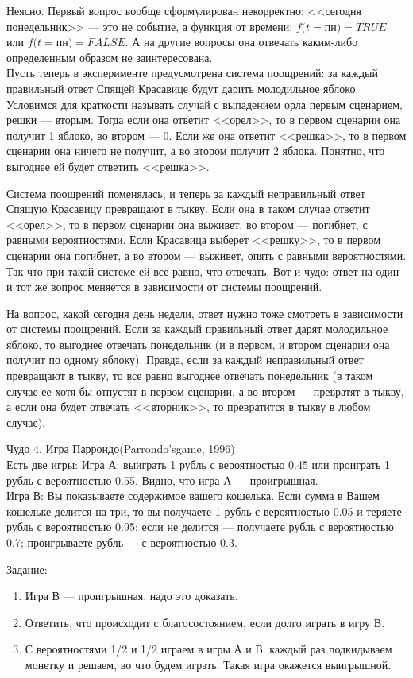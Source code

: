 Неясно. Первый вопрос вообще сформулирован некорректно: <<сегодня понедельник>> --- это не событие, а функция от времени: $f(t=$пн$)=TRUE$ или $f(t=$пн$)=FALSE$.
А на другие вопросы она отвечать каким-либо определенным образом не заинтересована. \\

Пусть теперь в эксперименте предусмотрена система поощрений: за каждый правильный ответ Спящей Красавице будут дарить молодильное яблоко. 
Условимся для краткости называть случай с выпадением орла первым сценарием, решки --- вторым.
Тогда если она ответит <<орел>>, то в первом сценарии она получит 1 яблоко, во втором --- 0.
Если же она ответит <<решка>>, то в первом сценарии она ничего не получит, а во втором получит 2 яблока.
Понятно, что выгоднее ей будет ответить <<решка>>.

Система поощрений поменялась, и теперь за каждый неправильный ответ Спящую Красавицу превращают в тыкву.
Если она в таком случае ответит <<орел>>, то в первом сценарии она выживет, во втором --- погибнет, с равными вероятностями. Если Красавица выберет <<решку>>, то в первом сценарии она  погибнет, а во втором --- выживет, опять с равными вероятностями. Так что при такой системе ей все равно, что отвечать.
Вот и чудо: ответ на один и тот же вопрос меняется в зависимости от системы поощрений.

На вопрос, какой сегодня день недели, ответ нужно тоже смотреть в зависимости от системы поощрений. Если за каждый правильный ответ дарят молодильное яблоко, то выгоднее отвечать понедельник (и в первом, и втором сценарии она получит по одному яблоку). Правда, если за каждый неправильный ответ превращают в тыкву, то все равно выгоднее отвечать понедельник (в таком случае ее хотя бы отпустят в первом сценарии, а во втором --- превратят в тыкву, а если она будет отвечать <<вторник>>, то превратится в тыкву в любом случае).

Чудо 4. Игра Паррондо(Parrondo'sgame, 1996)\\
Есть две игры:
Игра А: выиграть 1 рубль с вероятностью 0.45 или проиграть 1 рубль с вероятностью 0.55. Видно, что игра А --- проигрышная.\\
Игра В: Вы показываете содержимое вашего кошелька. Если сумма в Вашем кошельке делится на три, то вы получаете 1 рубль с вероятностью 0.05 и теряете рубль с вероятностью 0.95; если не делится --- получаете рубль с вероятностью 0.7; проигрываете рубль --- с вероятностью 0.3.

Задание:
\begin{enumerate}
\item Игра В --- проигрышная, надо это доказать.
\item Ответить, что происходит с благосостоянием, если долго играть в игру В.
\item С вероятностями 1/2 и 1/2 играем в игры А и В: каждый раз подкидываем монетку и решаем, во что будем играть. Такая игра окажется выигрышной.
\end{enumerate}

